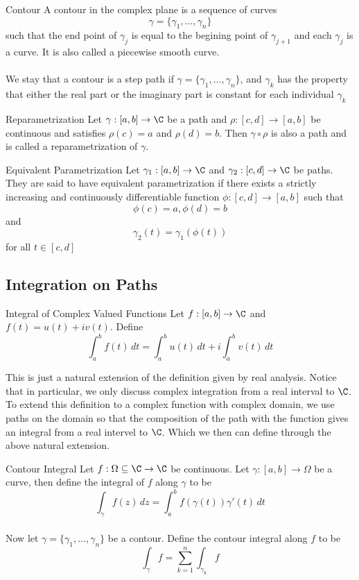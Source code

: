 \documentclass[a4paper]{article}
\begin{document}
\begin{defn}{Contour}{} A contour in the complex plane is a sequence of curves $$\gamma=\{\gamma_1,\dots,\gamma_n\}$$ such that the end point of $\gamma_j$ is equal to the begining point of $\gamma_{j+1}$ and each $\gamma_j$ is a curve. It is also called a piecewise smooth curve. \\~\\
We stay that a contour is a step path if $\gamma=\{\gamma_1,\dots,\gamma_n\}$, and $\gamma_k$ has the property that either the real part or the imaginary part is constant for each individual $\gamma_k$
\end{defn}

\begin{defn}{Reparametrization}{} Let $\gamma:[a,b]\to\C$ be a path and $\rho:[c,d]\to[a,b]$ be continuous and satisfies $\rho(c)=a$ and $\rho(d)=b$. Then $\gamma\circ\rho$ is also a path and is called a reparametrization of $\gamma$. 
\end{defn}

\begin{defn}{Equivalent Parametrization}{} Let $\gamma_1:[a,b]\to\C$ and $\gamma_2:[c,d]\to\C$ be paths. They are said to have equivalent parametrization if there exists a strictly increasing and continuously differentiable function $\phi:[c,d]\to[a,b]$ such that $$\phi(c)=a, \phi(d)=b$$ and $$\gamma_2(t)=\gamma_1(\phi(t))$$ for all $t\in[c,d]$
\end{defn}

\subsection{Integration on Paths}
\begin{defn}{Integral of Complex Valued Functions}{} Let $f:[a,b]\to\C$ and $f(t)=u(t)+iv(t)$. Define $$\int_a^bf(t)\,dt=\int_a^bu(t)\,dt+i\int_a^bv(t)\,dt$$
\end{defn}

This is just a natural extension of the definition given by real analysis. Notice that in particular, we only discuss complex integration from a real interval to $\C$. To extend this definition to a complex function with complex domain, we use paths on the domain so that the composition of the path with the function gives an integral from a real intervel to $\C$. Which we then can define through the above natural extension. 

\begin{defn}{Contour Integral}{} Let $f:\Omega\subseteq\C\to\C$ be continuous. Let $\gamma:[a,b]\to\Omega$ be a curve, then define the integral of $f$ along $\gamma$ to be $$\int_{\gamma}f(z)\,dz=\int_a^bf(\gamma(t))\gamma'(t)\,dt$$~\\
Now let $\gamma=\{\gamma_1,\dots,\gamma_n\}$ be a contour. Define the contour integral along $f$ to be $$\int_{\gamma}f=\sum_{k=1}^n\int_{\gamma_k}f$$
\end{defn}
\end{document}
